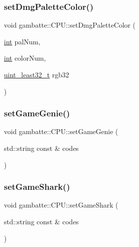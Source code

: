 \mbox{\label{classgambatte_1_1CPU_a4453327ee201a535a33ec761d77f686e}} 
\subsubsection{\texorpdfstring{set\+Dmg\+Palette\+Color()}{setDmgPaletteColor()}}
{\footnotesize\ttfamily void gambatte\+::\+C\+P\+U\+::set\+Dmg\+Palette\+Color (\begin{DoxyParamCaption}\item[{\hyperlink{ioapi_8h_a787fa3cf048117ba7123753c1e74fcd6}{int}}]{pal\+Num,  }\item[{\hyperlink{ioapi_8h_a787fa3cf048117ba7123753c1e74fcd6}{int}}]{color\+Num,  }\item[{\hyperlink{namespacegambatte_a0639f09fccfbbd5a8e0796318768e370}{uint\+\_\+least32\+\_\+t}}]{rgb32 }\end{DoxyParamCaption})\hspace{0.3cm}{\ttfamily [inline]}}

\mbox{\label{classgambatte_1_1CPU_a728f7e9b1dadc78125ddfae49c62e24c}} 
\subsubsection{\texorpdfstring{set\+Game\+Genie()}{setGameGenie()}}
{\footnotesize\ttfamily void gambatte\+::\+C\+P\+U\+::set\+Game\+Genie (\begin{DoxyParamCaption}\item[{std\+::string const \&}]{codes }\end{DoxyParamCaption})\hspace{0.3cm}{\ttfamily [inline]}}

\mbox{\label{classgambatte_1_1CPU_a075af7ec08cc0ab12857c09e454a21c3}} 
\subsubsection{\texorpdfstring{set\+Game\+Shark()}{setGameShark()}}
{\footnotesize\ttfamily void gambatte\+::\+C\+P\+U\+::set\+Game\+Shark (\begin{DoxyParamCaption}\item[{std\+::string const \&}]{codes }\end{DoxyParamCaption})\hspace{0.3cm}{\ttfamily [inline]}}

